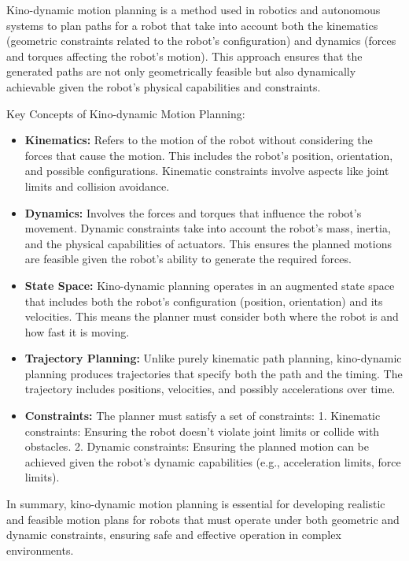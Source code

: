 \documentclass[9pt,a4paper,twoside]{rho-class/rho}
\begin{document}
    Kino-dynamic motion planning is a method used in robotics and autonomous systems to plan paths for a robot that take into account both the kinematics (geometric constraints related to the robot's configuration) and dynamics (forces and torques affecting the robot's motion). This approach ensures that the generated paths are not only geometrically feasible but also dynamically achievable given the robot's physical capabilities and constraints.

    Key Concepts of Kino-dynamic Motion Planning:
    \begin{itemize}
        \item \textbf{Kinematics:} Refers to the motion of the robot without considering the forces that cause the motion. This includes the robot's position, orientation, and possible configurations. Kinematic constraints involve aspects like joint limits and collision avoidance.
        
        \item \textbf{Dynamics:} Involves the forces and torques that influence the robot's movement. Dynamic constraints take into account the robot's mass, inertia, and the physical capabilities of actuators. This ensures the planned motions are feasible given the robot's ability to generate the required forces.
        
        \item \textbf{State Space:} Kino-dynamic planning operates in an augmented state space that includes both the robot's configuration (position, orientation) and its velocities. This means the planner must consider both where the robot is and how fast it is moving.
        
        \item \textbf{Trajectory Planning:} Unlike purely kinematic path planning, kino-dynamic planning produces trajectories that specify both the path and the timing. The trajectory includes positions, velocities, and possibly accelerations over time.
        
        \item \textbf{Constraints:} The planner must satisfy a set of constraints:
         1. Kinematic constraints: Ensuring the robot doesn't violate joint limits or collide with obstacles.
         2. Dynamic constraints: Ensuring the planned motion can be achieved given the robot's dynamic capabilities (e.g., acceleration limits, force limits).
    \end{itemize}
    
    
    In summary, kino-dynamic motion planning is essential for developing realistic and feasible motion plans for robots that must operate under both geometric and dynamic constraints, ensuring safe and effective operation in complex environments.
\end{document}
